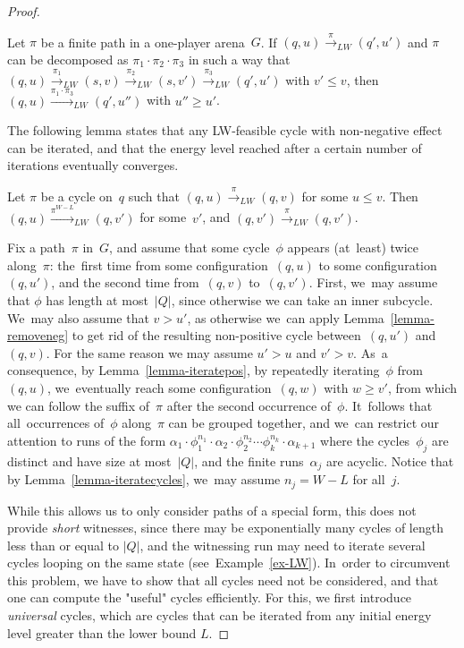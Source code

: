 \begin{proof}
\vskip 0.5cm
\begin{lemma}
\label{lemma-removeneg}
  Let $\pi$ be a finite path in a one-player arena~$G$.
  If $(q,u) \xrightarrow{\pi}_{LW} (q',u')$ and $\pi$ can be decomposed as
  $\pi_1\cdot\pi_2\cdot \pi_3$ in such a way that
  $(q,u) \xrightarrow{\pi_1}_{LW}
  (s,v)\xrightarrow{\pi_2}_{LW}(s,v') \xrightarrow{\pi_3}_{LW}(q',u')$ with $v'\leq
  v$, then $(q,u)\xrightarrow{\pi_1\cdot\pi_3}_{LW} (q',u'')$ with $u''\geq
  u'$.
\end{lemma}


The following lemma states that any LW-feasible cycle with
non-negative effect can be iterated, and that the energy level reached after a certain number of  iterations
eventually converges.
\vskip 0.5cm
\begin{lemma}\label{lemma-iteratecycles}
  Let $\pi$ be a cycle on~$q$ such that $(q,u) \xrightarrow{\pi}_{LW} (q,v)$
  for some $u\leq v$. Then $(q,u) \xrightarrow{\pi^{W-L}}_{LW} (q,v')$ for
  some~$v'$, and $(q,v')\xrightarrow{\pi}_{LW} (q,v')$.
\end{lemma}


Fix a path~$\pi$ in~$G$, and assume that some cycle~$\phi$ appears
(at~least) twice along~$\pi$: the~first time from some
configuration~$(q,u)$ to some configuration~$(q,u')$, and the second
time from~$(q,v)$ to~$(q,v')$. First, we~may assume that $\phi$ has
length at most~$|Q|$, since otherwise we can take an inner
subcycle.  We~may also assume that $v>u'$, as otherwise we~can apply
Lemma~\ref{lemma-removeneg} to get rid of the resulting non-positive cycle between~$(q,u')$ and~$(q,v)$. For the same reason we may assume
$u'>u$ and $v'>v$.  As~a consequence, by Lemma~\ref{lemma-iteratepos},
by repeatedly iterating~$\phi$ 
from~$(q,u)$, we~eventually reach some
configuration~$(q,w)$ with $w\geq v'$, from which we can follow the
suffix of~$\pi$ after the second occurrence of~$\phi$. It~follows that
all~occurrences of~$\phi$ along~$\pi$ can be grouped together, and
we~can restrict our attention to runs of the form $\alpha_1\cdot
\phi_1^{n_1}\cdot \alpha_2\cdot\phi_2^{n_2}\cdots
\phi_k^{n_k}\cdot\alpha_{k+1}$ where the cycles~$\phi_j$ are distinct
and have size at most~$|Q|$, and the finite runs~$\alpha_j$ are
acyclic.  Notice that by Lemma~\ref{lemma-iteratecycles}, we~may
assume $n_j=W-L$ for all~$j$.




While this allows us to only consider paths of a special form, this
does not provide \emph{short} witnesses, since there may be
exponentially many cycles of length less than or equal to $|Q|$,
and the witnessing run may need to iterate several cycles looping on
the same state (see~Example~\ref{ex-LW}).
In~order to circumvent this problem, we have to show that all cycles need not be considered, and that one 
can compute the "useful" cycles efficiently. 
For this, we first
introduce \emph{universal} cycles, which are cycles
that can be iterated from any initial energy level greater than the lower bound $L$.


\end{proof}
